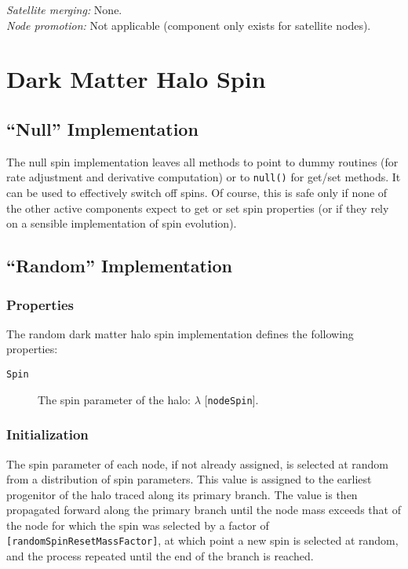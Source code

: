 \noindent\emph{Satellite merging:} None.\\

\noindent\emph{Node promotion:} Not applicable (component only exists for satellite nodes).\\

\section{Dark Matter Halo Spin}\label{sec:DarkMatterHaloSpinComponent}

\subsection{``Null'' Implementation}

The null spin implementation leaves all methods to point to dummy routines (for rate adjustment and derivative computation) or to {\tt null()} for get/set methods. It can be used to effectively switch off spins. Of course, this is safe only if none of the other active components expect to get or set spin properties (or if they rely on a sensible implementation of spin evolution).

\subsection{``Random'' Implementation}

\subsubsection{Properties}

The random dark matter halo spin implementation defines the following properties:
\begin{description}
 \item [{\tt Spin}] The spin parameter of the halo: $\lambda$ [{\tt nodeSpin}].
\end{description}

\subsubsection{Initialization}

The spin parameter of each node, if not already assigned, is selected at random from a distribution of spin parameters. This value is assigned to the earliest progenitor of the halo traced along its primary branch. The value is then propagated forward along the primary branch until the node mass exceeds that of the node for which the spin was selected by a factor of {\tt [randomSpinResetMassFactor]}, at which point a new spin is selected at random, and the process repeated until the end of the branch is reached. 

